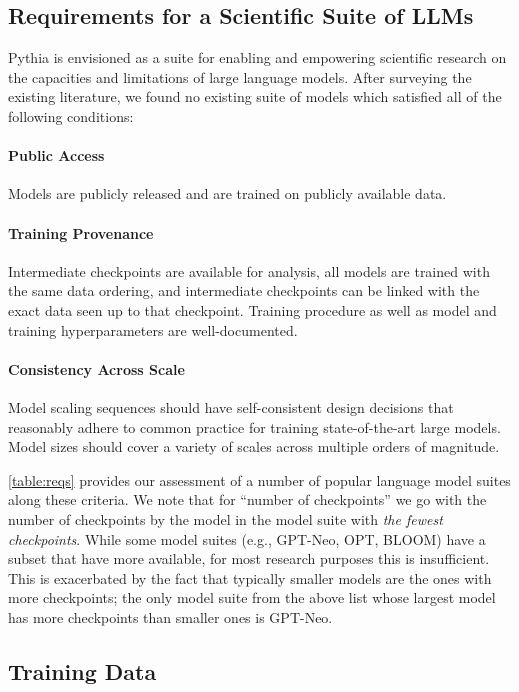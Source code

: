 \subsection{Requirements for a Scientific Suite of LLMs}

Pythia is envisioned as a suite for enabling and empowering scientific research on the capacities and limitations of large language models. After surveying the existing literature, we found no existing suite of models which satisfied all of the following conditions:

\paragraph{Public Access} Models are publicly released and are trained on publicly available data.

\paragraph{Training Provenance} Intermediate checkpoints are available for analysis, all models are trained with the same data ordering, and intermediate checkpoints can be linked with the exact data seen up to that checkpoint. Training procedure as well as model and training hyperparameters are well-documented.

\paragraph{Consistency Across Scale} Model scaling sequences should have self-consistent design decisions that reasonably adhere to common practice for training state-of-the-art large models. Model sizes should cover a variety of scales across multiple orders of magnitude.

\ref{table:reqs} provides our assessment of a number of popular language model suites along these criteria. We note that for ``number of checkpoints'' we go with the number of checkpoints by the model in the model suite with \textit{the fewest checkpoints}. While some model suites (e.g., GPT-Neo, OPT, BLOOM) have a subset that have more available, for most research purposes this is insufficient. This is exacerbated by the fact that typically smaller models are the ones with more checkpoints; the only model suite from the above list whose largest model has more checkpoints than smaller ones is GPT-Neo.

\subsection{Training Data}

